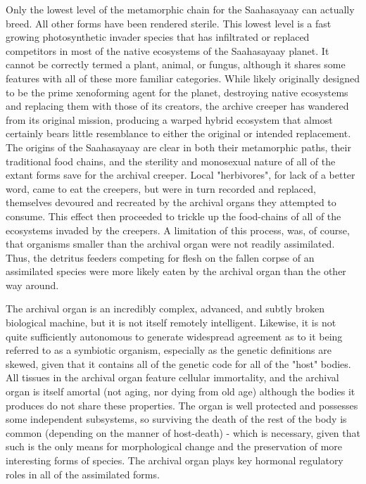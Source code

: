 Only the lowest level of the metamorphic chain for the Saahasayaay can
actually breed. All other forms have been rendered sterile. This
lowest level is a fast growing photosynthetic invader species that has
infiltrated or replaced competitors in most of the native ecosystems
of the Saahasayaay planet. It cannot be correctly termed a plant,
animal, or fungus, although it shares some features with all of these
more familiar categories. While likely originally designed to be the
prime xenoforming agent for the planet, destroying native ecosystems
and replacing them with those of its creators, the archive creeper has
wandered from its original mission, producing a warped hybrid
ecosystem that almost certainly bears little resemblance to either the
original or intended replacement. The origins of the Saahasayaay are
clear in both their metamorphic paths, their traditional food chains,
and the sterility and monosexual nature of all of the extant forms
save for the archival creeper. Local "herbivores", for lack of a
better word, came to eat the creepers, but were in turn recorded and
replaced, themselves devoured and recreated by the archival organs
they attempted to consume. This effect then proceeded to trickle up
the food-chains of all of the ecosystems invaded by the creepers. A
limitation of this process, was, of course, that organisms smaller
than the archival organ were not readily assimilated. Thus, the
detritus feeders competing for flesh on the fallen corpse of an
assimilated species were more likely eaten by the archival organ than
the other way around.

The archival organ is an incredibly complex, advanced, and subtly
broken biological machine, but it is not itself remotely
intelligent. Likewise, it is not quite sufficiently autonomous to
generate widespread agreement as to it being referred to as a
symbiotic organism, especially as the genetic definitions are skewed,
given that it contains all of the genetic code for all of the "host"
bodies. All tissues in the archival organ feature cellular
immortality, and the archival organ is itself amortal (not aging, nor
dying from old age) although the bodies it produces do not share these
properties. The organ is well protected and possesses some independent
subsystems, so surviving the death of the rest of the body is common
(depending on the manner of host-death) - which is necessary, given
that such is the only means for morphological change and the
preservation of more interesting forms of species. The archival organ
plays key hormonal regulatory roles in all of the assimilated forms.

